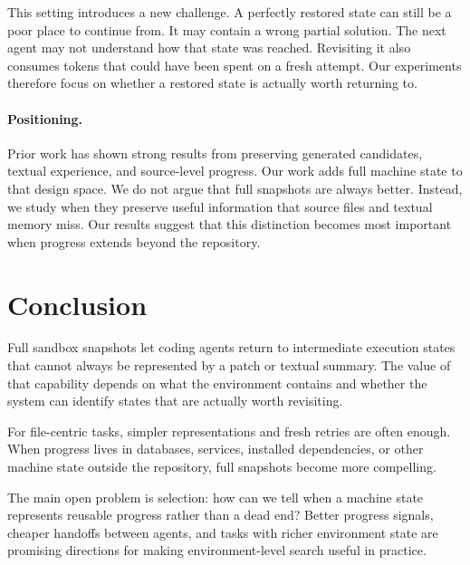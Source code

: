 \documentclass{article}
\begin{document}
This setting introduces a new challenge. A perfectly restored state can still be a poor place to continue from. It may contain a wrong partial solution. The next agent may not understand how that state was reached. Revisiting it also consumes tokens that could have been spent on a fresh attempt. Our experiments therefore focus on whether a restored state is actually worth returning to.

\paragraph{Positioning.}
Prior work has shown strong results from preserving generated candidates, textual experience, and source-level progress. Our work adds full machine state to that design space. We do not argue that full snapshots are always better. Instead, we study when they preserve useful information that source files and textual memory miss. Our results suggest that this distinction becomes most important when progress extends beyond the repository.

\section{Conclusion}
\label{sec:conclusion}

Full sandbox snapshots let coding agents return to intermediate execution states that cannot always be represented by a patch or textual summary. The value of that capability depends on what the environment contains and whether the system can identify states that are actually worth revisiting.

For file-centric tasks, simpler representations and fresh retries are often enough. When progress lives in databases, services, installed dependencies, or other machine state outside the repository, full snapshots become more compelling.

The main open problem is selection: how can we tell when a machine state represents reusable progress rather than a dead end? Better progress signals, cheaper handoffs between agents, and tasks with richer environment state are promising directions for making environment-level search useful in practice.



\end{document}

